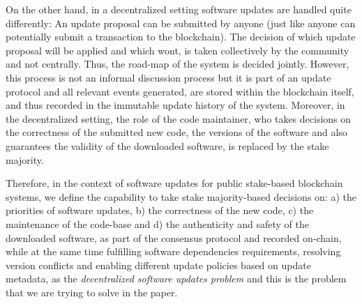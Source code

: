 On the other hand, in a decentralized setting software updates are handled quite differently: An update proposal can be submitted by anyone (just like anyone can potentially submit a transaction to the blockchain). The decision of which update proposal will be applied and which wont, is taken collectively by the community and not centrally. Thus, the road-map of the system is decided jointly. However, this process is not an informal discussion process but it is part of an update protocol and all relevant events generated, are stored within the blockchain itself, and thus recorded in the immutable update history of the system. Moreover, in the decentralized setting, the role of the code maintainer, who takes decisions on the correctness of the submitted new code, the versions of the software and also guarantees the validity of the downloaded software, is replaced by the stake majority. 

Therefore, in the context of software updates for public stake-based blockchain systems, we define the capability to take stake majority-based decisions on: a) the priorities of software updates, b) the correctness of the new code, c) the maintenance of the code-base and d) the authenticity and safety of the downloaded software, as part of the consensus protocol and recorded on-chain, while at the same time fulfilling software dependencies requirements, resolving version conflicts and enabling different update policies based on update metadata, as the \emph{decentralized software updates problem} and this is the problem that we are trying to solve in the paper.




